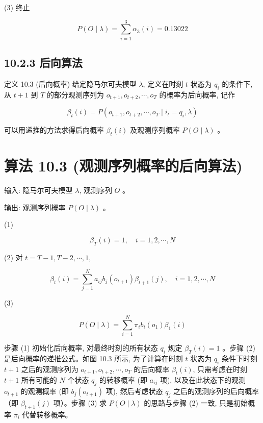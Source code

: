 \documentclass[10pt]{article}
\begin{document}
(3) 终止

$$
P(O \mid \lambda)=\sum_{i=1}^{3} \alpha_{3}(i)=0.13022
$$

\subsection*{10.2.3 后向算法}
定义 10.3 (后向概率) 给定隐马尔可夫模型 $\lambda$, 定义在时刻 $t$ 状态为 $q_{i}$ 的条件下, 从 $t+1$ 到 $T$ 的部分观测序列为 $o_{t+1}, o_{t+2}, \cdots, o_{T}$ 的概率为后向概率, 记作


\begin{equation*}
\beta_{t}(i)=P\left(o_{t+1}, o_{t+2}, \cdots, o_{T} \mid i_{t}=q_{i}, \lambda\right) \tag{10.18}
\end{equation*}


可以用递推的方法求得后向概率 $\beta_{t}(i)$ 及观测序列概率 $P(O \mid \lambda)$ 。

\section*{算法 10.3 (观测序列概率的后向算法)}
输入: 隐马尔可夫模型 $\lambda$, 观测序列 $O$ 。

输出: 观测序列概率 $P(O \mid \lambda)$ 。

(1)


\begin{equation*}
\beta_{T}(i)=1, \quad i=1,2, \cdots, N \tag{10.19}
\end{equation*}


(2) 对 $t=T-1, T-2, \cdots, 1$,


\begin{equation*}
\beta_{t}(i)=\sum_{j=1}^{N} a_{i j} b_{j}\left(o_{t+1}\right) \beta_{t+1}(j), \quad i=1,2, \cdots, N \tag{10.20}
\end{equation*}


(3)


\begin{equation*}
P(O \mid \lambda)=\sum_{i=1}^{N} \pi_{i} b_{i}\left(o_{1}\right) \beta_{1}(i) \tag{10.21}
\end{equation*}


步骤 (1) 初始化后向概率, 对最终时刻的所有状态 $q_{i}$ 规定 $\beta_{T}(i)=1$ 。步骤 (2) 是后向概率的递推公式。如图 10.3 所示, 为了计算在时刻 $t$ 状态为 $q_{i}$ 条件下时刻 $t+1$ 之后的观测序列为 $o_{t+1}, o_{t+2}, \cdots, o_{T}$ 的后向概率 $\beta_{t}(i)$, 只需考虑在时刻 $t+1$ 所有可能的 $N$ 个状态 $q_{j}$ 的转移概率 (即 $a_{i j}$ 项), 以及在此状态下的观测 $o_{t+1}$ 的观测概率 (即 $b_{j}\left(o_{t+1}\right)$ 项), 然后考虑状态 $q_{j}$ 之后的观测序列的后向概率（即 $\beta_{t+1}(j)$ 项）。步骤 (3) 求 $P(O \mid \lambda)$ 的思路与步骤 (2) 一致, 只是初始概率 $\pi_{i}$ 代替转移概率。
\end{document}
